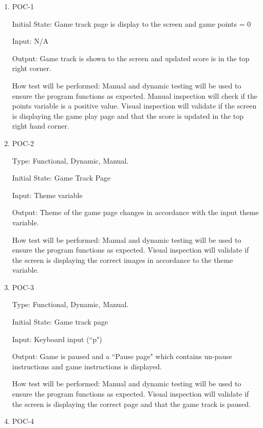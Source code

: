 \documentclass[12pt, titlepage]{article}
\begin{document}
\begin{enumerate}

\item{POC-1\\}
					
Initial State: Game track page is display to the screen and game points = 0
					
Input: N/A
					
Output: Game track is shown to the screen and updated score is in the top right corner. 
					
How test will be performed: Manual and dynamic testing will be used to ensure the program functions as expected. Manual inspection will check if the points variable is a positive value. Visual inspection will validate if the screen is displaying the game play page and that the score is updated in the top right hand corner. 
					
\item{POC-2\\}

Type: Functional, Dynamic, Manual.
					
Initial State: Game Track Page
					
Input: Theme variable
					
Output: Theme of the game page changes in accordance with the input theme variable.
					
How test will be performed: Manual and dynamic testing will be used to ensure the program functions as expected. Visual inspection will validate if the screen is displaying the correct images in accordance to the theme variable.   

\item{POC-3\\}

Type: Functional, Dynamic, Manual.
					
Initial State: Game track page
					
Input: Keyboard input (``p")
					
Output: Game is paused and a ``Pause page" which contains un-pause instructions and game instructions is displayed.
					
How test will be performed: Manual and dynamic testing will be used to ensure the program functions as expected. Visual inspection will validate if the screen is displaying the correct page and that the game track is paused.

\item{POC-4\\}


\end{enumerate}
\end{document}
